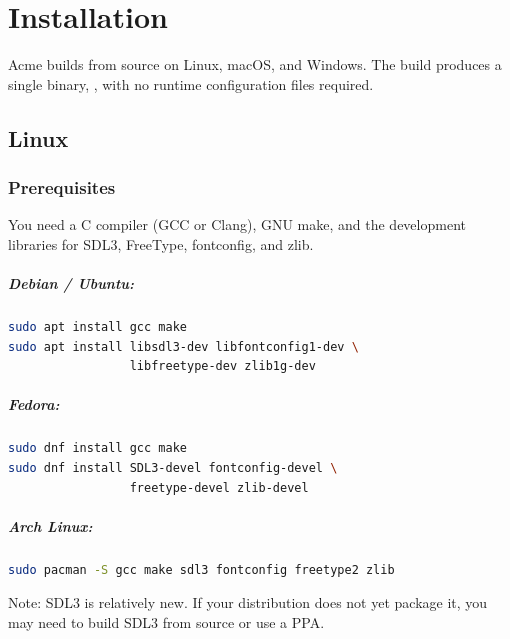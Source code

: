 \chapter{Installation}
\label{ch:install}


Acme builds from source on Linux, macOS, and Windows.  The build
produces a single binary, , with no runtime
configuration files required.

\section{Linux}
\label{sec:install-linux}


\subsection{Prerequisites}

You need a C compiler (GCC or Clang), GNU make, and the development
libraries for SDL3, FreeType, fontconfig, and zlib.

\paragraph{Debian / Ubuntu:}
\begin{lstlisting}[language=bash]
sudo apt install gcc make
sudo apt install libsdl3-dev libfontconfig1-dev \
                 libfreetype-dev zlib1g-dev
\end{lstlisting}

\paragraph{Fedora:}
\begin{lstlisting}[language=bash]
sudo dnf install gcc make
sudo dnf install SDL3-devel fontconfig-devel \
                 freetype-devel zlib-devel
\end{lstlisting}

\paragraph{Arch Linux:}
\begin{lstlisting}[language=bash]
sudo pacman -S gcc make sdl3 fontconfig freetype2 zlib
\end{lstlisting}

Note: SDL3 is relatively new.  If your distribution does not yet
package it, you may need to build SDL3 from source or use a PPA.

